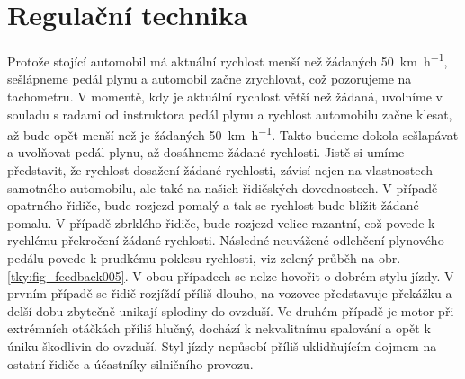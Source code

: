 \setchaptertoc
\chapter{Regulační technika}\label{tky:IchapIII}
    Protože stojící automobil má aktuální rychlost menší než žádaných \SI{50}{\km\per\hour},
    sešlápneme pedál plynu a automobil začne zrychlovat, což pozorujeme na tachometru. V momentě,
    kdy je aktuální rychlost větší než žádaná, uvolníme v souladu s radami od instruktora pedál
    plynu a rychlost automobilu začne klesat, až bude opět menší než je žádaných
    \SI{50}{\km\per\hour}. Takto budeme dokola sešlapávat a uvolňovat pedál plynu, až dosáhneme
    žádané rychlosti. Jistě si umíme představit, že rychlost dosažení žádané rychlosti, závisí nejen
    na vlastnostech samotného automobilu, ale také na našich řidičských dovednostech. V případě
    opatrného řidiče, bude rozjezd pomalý a tak se rychlost bude blížit žádané pomalu. V případě
    zbrklého řidiče, bude rozjezd velice razantní, což povede k rychlému překročení žádané
    rychlosti. Následné neuvážené odlehčení plynového pedálu povede k prudkému poklesu rychlosti,
    viz zelený průběh na obr. \ref{tky:fig_feedback005}. V obou případech se nelze hovořit o dobrém
    stylu jízdy. V prvním případě se řidič rozjíždí příliš dlouho, na vozovce představuje překážku a
    delší dobu zbytečně unikají splodiny do ovzduší. Ve druhém případě je motor při extrémních
    otáčkách příliš hlučný, dochází k nekvalitnímu spalování a opět k úniku škodlivin do ovzduší.
    Styl jízdy nepůsobí příliš uklidňujícím dojmem na ostatní řidiče a účastníky silničního provozu.

